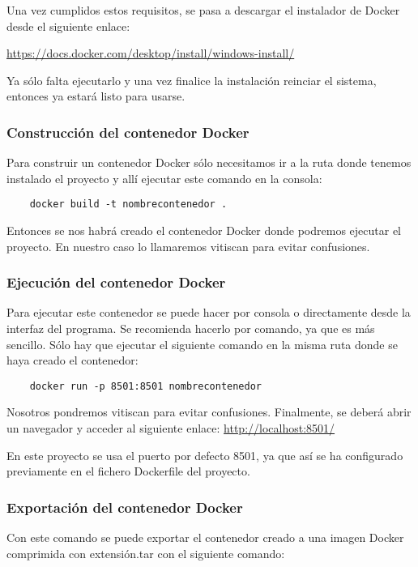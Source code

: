 Una vez cumplidos estos requisitos, se pasa a descargar el instalador de Docker desde el siguiente enlace:

\href{https://docs.docker.com/desktop/install/windows-install/}{https://docs.docker.com/desktop/install/windows-install/}

Ya sólo falta ejecutarlo y una vez finalice la instalación reinciar el sistema, entonces ya estará listo para usarse.

\subsubsection{Construcción del contenedor Docker}
Para construir un contenedor Docker sólo necesitamos ir a la ruta donde tenemos instalado el proyecto y allí ejecutar este comando en la consola:
\begin{verbatim}
    docker build -t nombrecontenedor .
\end{verbatim}

Entonces se nos habrá creado el contenedor Docker donde podremos ejecutar el proyecto.
En nuestro caso lo llamaremos vitiscan para evitar confusiones.

\subsubsection{Ejecución del contenedor Docker}
Para ejecutar este contenedor se puede hacer por consola o directamente desde la interfaz del programa. Se recomienda hacerlo por comando, ya que es más sencillo. Sólo hay que ejecutar el siguiente comando en la misma ruta donde se haya creado el contenedor:
\begin{verbatim}
    docker run -p 8501:8501 nombrecontenedor
\end{verbatim}

Nosotros pondremos vitiscan para evitar confusiones.
Finalmente, se deberá abrir un navegador y acceder al siguiente enlace:
\href{http://localhost:8501/}{http://localhost:8501/}

En este proyecto se usa el puerto por defecto 8501, ya que así se ha configurado previamente en el fichero Dockerfile del proyecto.

\subsubsection{Exportación del contenedor Docker}
Con este comando se puede exportar el contenedor creado a una imagen Docker comprimida con extensión.tar con el siguiente comando:

